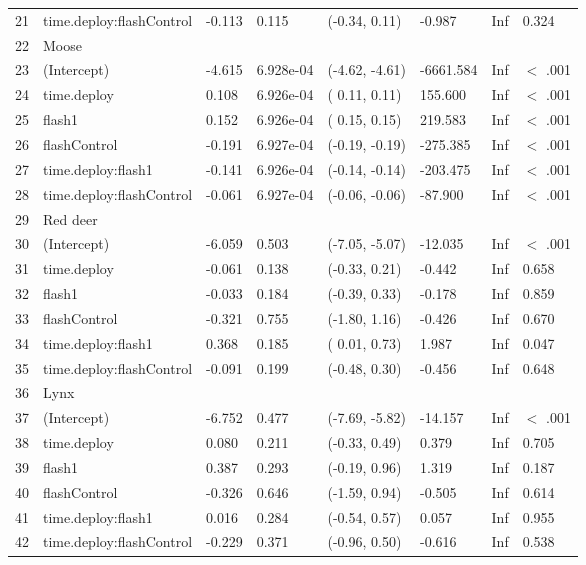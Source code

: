 \begin{table}[ht]
\begin{tabular}{rlllllll}
  21 & time.deploy:flashControl & -0.113 & 0.115 & (-0.34,  0.11) & -0.987 & Inf & 0.324  \\ 
  22 & Moose &  &  &  &  &  &        \\ 
  23 & (Intercept) & -4.615 & 6.928e-04 & (-4.62, -4.61) & -6661.584 & Inf & $<$ .001 \\ 
  24 & time.deploy & 0.108 & 6.926e-04 & ( 0.11,  0.11) & 155.600 & Inf & $<$ .001 \\ 
  25 & flash1 & 0.152 & 6.926e-04 & ( 0.15,  0.15) & 219.583 & Inf & $<$ .001 \\ 
  26 & flashControl & -0.191 & 6.927e-04 & (-0.19, -0.19) & -275.385 & Inf & $<$ .001 \\ 
  27 & time.deploy:flash1 & -0.141 & 6.926e-04 & (-0.14, -0.14) & -203.475 & Inf & $<$ .001 \\ 
  28 & time.deploy:flashControl & -0.061 & 6.927e-04 & (-0.06, -0.06) & -87.900 & Inf & $<$ .001 \\ 
  29 & Red deer &  &  &  &  &  &        \\ 
  30 & (Intercept) & -6.059 & 0.503 & (-7.05, -5.07) & -12.035 & Inf & $<$ .001 \\ 
  31 & time.deploy & -0.061 & 0.138 & (-0.33,  0.21) & -0.442 & Inf & 0.658  \\ 
  32 & flash1 & -0.033 & 0.184 & (-0.39,  0.33) & -0.178 & Inf & 0.859  \\ 
  33 & flashControl & -0.321 & 0.755 & (-1.80,  1.16) & -0.426 & Inf & 0.670  \\ 
  34 & time.deploy:flash1 & 0.368 & 0.185 & ( 0.01,  0.73) & 1.987 & Inf & 0.047  \\ 
  35 & time.deploy:flashControl & -0.091 & 0.199 & (-0.48,  0.30) & -0.456 & Inf & 0.648  \\ 
  36 & Lynx &  &  &  &  &  &        \\ 
  37 & (Intercept) & -6.752 & 0.477 & (-7.69, -5.82) & -14.157 & Inf & $<$ .001 \\ 
  38 & time.deploy & 0.080 & 0.211 & (-0.33,  0.49) & 0.379 & Inf & 0.705  \\ 
  39 & flash1 & 0.387 & 0.293 & (-0.19,  0.96) & 1.319 & Inf & 0.187  \\ 
  40 & flashControl & -0.326 & 0.646 & (-1.59,  0.94) & -0.505 & Inf & 0.614  \\ 
  41 & time.deploy:flash1 & 0.016 & 0.284 & (-0.54,  0.57) & 0.057 & Inf & 0.955  \\ 
  42 & time.deploy:flashControl & -0.229 & 0.371 & (-0.96,  0.50) & -0.616 & Inf & 0.538  \\ 
   \hline
\end{tabular}
\end{table}
